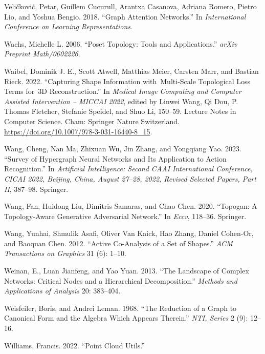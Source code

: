 \documentclass[
  12pt,
]{krantz}
\newlength{\cslhangindent}
\newenvironment{CSLReferences}[2] %
 {\begin{list}{}{%
  \setlength{\itemindent}{0pt}
  \setlength{\leftmargin}{0pt}
  \setlength{\parsep}{0pt}
  \ifodd #1
   \setlength{\leftmargin}{\cslhangindent}
   \setlength{\itemindent}{-1\cslhangindent}
  \fi
  \setlength{\itemsep}{#2\baselineskip}}}
 {\end{list}}
\begin{document}
\begin{CSLReferences}{1}{0}
Veličković, Petar, Guillem Cucurull, Arantxa Casanova, Adriana Romero,
Pietro Lio, and Yoshua Bengio. 2018. {``Graph Attention Networks.''} In
\emph{International Conference on Learning Representations}.

Wachs, Michelle L. 2006. {``Poset Topology: Tools and Applications.''}
\emph{arXiv Preprint Math/0602226}.

Waibel, Dominik J. E., Scott Atwell, Matthias Meier, Carsten Marr, and
Bastian Rieck. 2022. {``Capturing {Shape} {Information}
with~{Multi}-{Scale} {Topological} {Loss} {Terms} for~{3D}
{Reconstruction}.''} In \emph{Medical {Image} {Computing} and {Computer}
{Assisted} {Intervention} -- {MICCAI} 2022}, edited by Linwei Wang, Qi
Dou, P. Thomas Fletcher, Stefanie Speidel, and Shuo Li, 150--59. Lecture
{Notes} in {Computer} {Science}. Cham: Springer Nature Switzerland.
\url{https://doi.org/10.1007/978-3-031-16440-8_15}.

Wang, Cheng, Nan Ma, Zhixuan Wu, Jin Zhang, and Yongqiang Yao. 2023.
{``Survey of Hypergraph Neural Networks and Its Application to Action
Recognition.''} In \emph{Artificial Intelligence: Second CAAI
International Conference, CICAI 2022, Beijing, China, August 27--28,
2022, Revised Selected Papers, Part II}, 387--98. Springer.

Wang, Fan, Huidong Liu, Dimitris Samaras, and Chao Chen. 2020.
{``Topogan: A Topology-Aware Generative Adversarial Network.''} In
\emph{Eccv}, 118--36. Springer.

Wang, Yunhai, Shmulik Asafi, Oliver Van Kaick, Hao Zhang, Daniel
Cohen-Or, and Baoquan Chen. 2012. {``Active Co-Analysis of a Set of
Shapes.''} \emph{ACM Transactions on Graphics} 31 (6): 1--10.

Weinan, E., Luan Jianfeng, and Yao Yuan. 2013. {``The Landscape of
Complex Networks: Critical Nodes and a Hierarchical Decomposition.''}
\emph{Methods and Applications of Analysis} 20: 383--404.

Weisfeiler, Boris, and Andrei Leman. 1968. {``The Reduction of a Graph
to Canonical Form and the Algebra Which Appears Therein.''} \emph{NTI,
Series} 2 (9): 12--16.

Williams, Francis. 2022. {``Point {C}loud {U}tils.''}


\end{CSLReferences}
\end{document}
